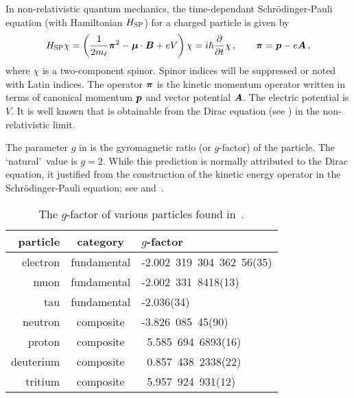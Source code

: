 In non-relativistic quantum mechanics, the time-dependant Schr{\"o}dinger-Pauli equation (with Hamiltonian $H_{\rm SP}$) for a charged particle is given by
\begin{gather}
	\label{sp:1}
    {H}_{\mathrm{SP}}\chi=\left(\frac{1}{2m_{\ell}}\boldsymbol{\pi}^{2}-\boldsymbol{\mu}\cdot\boldsymbol{B}+e{ V}\right)\chi=i\hbar\frac{\partial}{\partial t}\chi\,,\qquad
    \boldsymbol{\pi}=\boldsymbol{ p}-e{\boldsymbol{A}}\,,
\end{gather}
where $\chi$ is a two-component spinor. Spinor indices will be suppressed or noted with Latin indices. The operator $\boldsymbol{\pi}$ is the kinetic momentum operator written in terms of canonical momentum $\boldsymbol{p}$ and vector potential $\boldsymbol{A}$. The electric potential is $V$. It is well known that  is obtainable from the Dirac equation (see ) in the non-relativistic limit.

The parameter $g$ in  is the gyromagnetic ratio (or $g$-factor) of the particle. The \lq natural\rq\ value is $g=2$. While this prediction is normally attributed to the Dirac equation, it justified from the construction of the kinetic energy operator in the Schr{\"o}dinger-Pauli equation; see  and~\cite{sakurai1967advanced}. 

\begin{table}
	\centering
\begin{tabular}{r|c|l}
    particle & category & $g$-factor\\
    \hline
	electron & fundamental & -2.002\ 319\ 304\ 362\ 56(35)\\
	muon & fundamental & -2.002\ 331\ 8418(13)\\
	tau & fundamental & -2.036(34)\\
	neutron & composite & -3.826\ 085\ 45(90)\\
	proton & composite & \ 5.585\ 694\ 6893(16)\\
	deuterium & composite & \ 0.857\ 438\ 2338(22)\\
	tritium & composite & \ 5.957\ 924\ 931(12)\\
\end{tabular}
	\caption{The $g$-factor of various particles found in~\cite{ParticleDataGroup:2022pth}.}
	\label{tab:gfactor}
\end{table}

